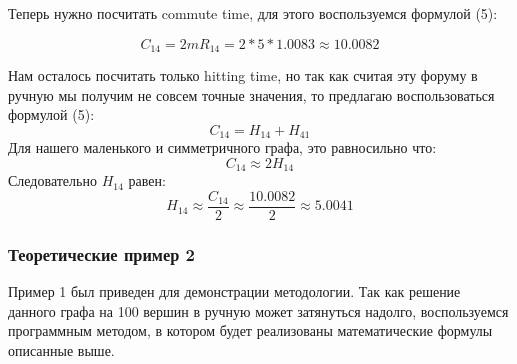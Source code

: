 \documentclass{article}
\begin{document}
Теперь нужно посчитать commute time, для этого воспользуемся формулой (5):

$$ C_{14} = 2mR_{14} = 2 * 5 * 1.0083 \approx 10.0082$$

Нам осталось посчитать только hitting time, но так как считая эту форуму в ручную мы получим не совсем точные значения, то предлагаю воспользоваться формулой (5):
$$ C_{14} = H_{14} + H_{41} $$
Для нашего маленького и симметричного графа, это равносильно что:
$$ C_{14} \approx 2H_{14} $$
Следовательно \(H_{14}\) равен:
$$ H_{14}  \approx \frac{C_{14} }{2} \approx \frac{10.0082}{2} \approx 5.0041$$ 

\subsubsection{Теоретические пример 2}
Пример 1 был приведен для демонстрации методологии. Так как решение данного графа на 100 вершин в ручную может затянуться надолго, воспользуемся программным методом, в котором будет реализованы математические формулы описанные выше.
\end{document}
